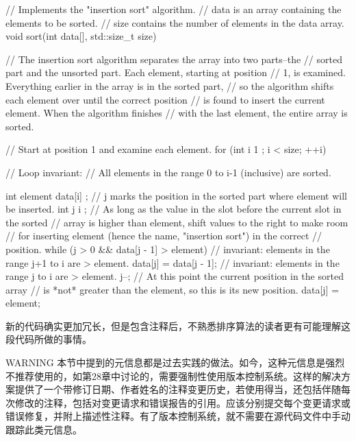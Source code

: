 \begin{cpp}
// Implements the "insertion sort" algorithm.
// data is an array containing the elements to be sorted.
// size contains the number of elements in the data array.
void sort(int data[], std::size_t size)
{
    // The insertion sort algorithm separates the array into two parts--the
    // sorted part and the unsorted part. Each element, starting at position
    // 1, is examined. Everything earlier in the array is in the sorted part,
    // so the algorithm shifts each element over until the correct position
    // is found to insert the current element. When the algorithm finishes
    // with the last element, the entire array is sorted.

    // Start at position 1 and examine each element.
    for (int i { 1 }; i < size; ++i) {
        // Loop invariant:
        //   All elements in the range 0 to i-1 (inclusive) are sorted.

        int element { data[i] };
        // j marks the position in the sorted part where element will be inserted.
        int j { i };
        // As long as the value in the slot before the current slot in the sorted
        // array is higher than element, shift values to the right to make room
        // for inserting element (hence the name, "insertion sort") in the correct
        // position.
        while (j > 0 && data[j - 1] > element) {
            // invariant: elements in the range j+1 to i are > element.
            data[j] = data[j - 1];
            // invariant: elements in the range j to i are > element.
            j--;
        }
        // At this point the current position in the sorted array
        // is *not* greater than the element, so this is its new position.
        data[j] = element;
    }
}
\end{cpp}

新的代码确实更加冗长，但是包含注释后，不熟悉排序算法的读者更有可能理解这段代码所做的事情。


\begin{myWarning}{WARNING}
本节中提到的元信息都是过去实践的做法。如今，这种元信息是强烈不推荐使用的，如第28章中讨论的，需要强制性使用版本控制系统。这样的解决方案提供了一个带修订日期、作者姓名的注释变更历史，若使用得当，还包括伴随每次修改的注释，包括对变更请求和错误报告的引用。应该分别提交每个变更请求或错误修复，并附上描述性注释。有了版本控制系统，就不需要在源代码文件中手动跟踪此类元信息。
\end{myWarning}

